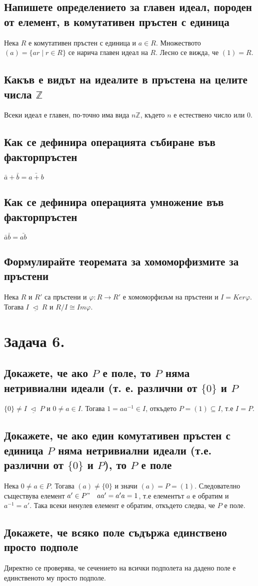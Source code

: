 \documentclass[10pt]{article}
\newcommand*{\Z}{\mathbb{Z}}
\newcommand{\triq}{\; \underline{\triangleleft} \;}
\begin{document}
\subsection*{Напишете определението за главен идеал, породен от елемент, в комутативен пръстен с единица}
Нека $R$ е комутативен пръстен с единица и $a \in R$. Множеството $(a) = \{ar \mid r\in R\}$ се нарича главен идеал на $R$. Лесно се вижда, че $(1) = R$.

\subsection*{Какъв е видът на идеалите в пръстена на целите числа $\Z$}
Всеки идеал е главен, по-точно има вида $n\Z$, където $n$ е естествено число или 0. 

\subsection*{Как се дефинира операцията събиране във факторпръстен}
$\bar{a} + \bar{b} = \bar{a + b}$

\subsection*{Как се дефинира операцията умножение във факторпръстен}
$\bar{a}\bar{b} = \bar{ab}$

\subsection*{Формулирайте теоремата за хомоморфизмите за пръстени}
Нека $R$ и $R'$ са пръстени и $\varphi: R \to R'$ е хомоморфизъм на пръстени и $I = Ker\varphi$. Тогава $I \triq R$ и $R/I \cong Im\varphi$. 

\section*{Задача 6.} 
\subsection*{Докажете, че ако $P$ е поле, то $P$ няма нетривиални идеали (т. е. различни от $\{0\}$ и $P$}
$\{0\} \neq I \triq P$ и $0 \neq a \in I$. Тогава $1 = aa^{-1} \in I$, откъдето $P = (1) \subseteq I$, т.е $I = P$.

\subsection*{Докажете, че ако един комутативен пръстен с единица $P$ няма нетривиални идеали (т.е. различни от $\{0\}$ и $P$), то $P$ е поле}
Нека $0 \neq a \in P$. Тогава $(a) \neq \{0\}$ и значи $(a) = P = (1)$. Следователно съществува елемент $a' \in P" \quad aa' = a'a = 1$, т.е елементът $a$ е обратим и $a^{-1} = a'$. Така всеки ненулев елемент е обратим, откъдето следва, че $P$ е поле.

\subsection*{Докажете, че всяко поле съдържа единствено просто подполе}
Директно се проверява, че сечението на всички подполета на дадено поле е единственото му просто подполе.
\end{document}
